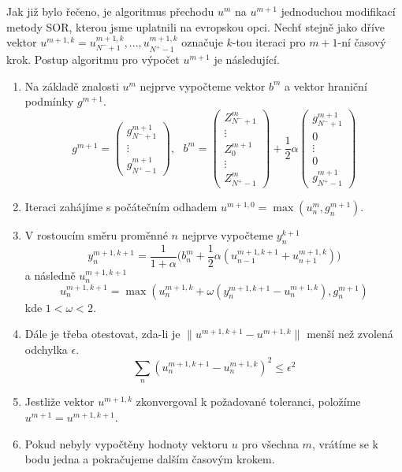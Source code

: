 \documentclass[a4paper]{book}
\begin{document}
Jak již bylo řečeno, je algoritmus přechodu $u^m$ na $u^{m+1}$ jednoduchou modifikací metody SOR, kterou jsme uplatnili na evropskou opci. Nechť stejně jako dříve vektor $u^{m+1,k} = u_{N^{-}+1}^{m+1,k},..., u_{N^{+}-1}^{m+1,k}$ označuje $k$-tou iteraci pro $m+1$-ní časový krok. Postup algoritmu pro výpočet $u^{m+1}$ je následující.
\begin{enumerate}
\item Na základě znalosti $u^m$ nejprve vypočteme vektor $b^m$ a vektor hraniční podmínky $g^{m+1}$.
\begin{equation*}
g^{m+1} =
	\begin{pmatrix}
		g_{N^{-}+1}^{m+1} \\
		\vdots \\
		g_{N^{+}-1}^{m+1}
	\end{pmatrix}
,~~~ b^{m} =
	\begin{pmatrix}
		Z_{N^{-}+1}^{m} \\
		\vdots \\
		Z_0^{m+1}\\
		\vdots \\
		Z_{N^{+}-1}^{m}
	\end{pmatrix}
	+ \frac{1}{2} \alpha
		\begin{pmatrix}
		g_{N^{-}+1}^{m+1} \\
		0 \\
		\vdots\\
		0 \\
		g_{N^{+}-1}^{m+1}
	\end{pmatrix}
\end{equation*}
\item Iteraci zahájíme s počátečním odhadem $u^{m+1,0} = \max(u_n^m, g_n^{m+1})$.
\item V rostoucím směru proměnné $n$ nejprve vypočteme $y_n^{k+1}$
\begin{equation*}
y_n^{m+1, k+1} = \frac{1}{1 + \alpha} \Big( b_n^m + \frac{1}{2} \alpha (u_{n-1}^{m+1, k+1} + u_{n+1}^{m+1, k}) \Big)
\end{equation*}
a následně $u_n^{m+1, k+1}$
\begin{equation*}
u_n^{m+1, k+1} = \max (u_n^{m+1, k} + \omega(y_n^{m+1, k+1} - u_n^{m+1, k}), g_n^{m+1})
\end{equation*}
kde $1 < \omega < 2$.
\item Dále je třeba otestovat, zda-li je $\| u^{m+1, k+1}-u^{m+1,k}\|$ menší než zvolená odchylka $\epsilon$.
\begin{equation*}
\sum_n (u_n^{m+1,k+1} - u_n^{m+1,k})^2 \le \epsilon^2
\end{equation*}
\item Jestliže vektor $u^{m+1,k}$ zkonvergoval k požadované toleranci, položíme $u^{m+1} = u^{m+1,k+1}$.
\item Pokud nebyly vypočtěny hodnoty vektoru $u$ pro všechna $m$, vrátíme se k bodu jedna a pokračujeme dalším časovým krokem.
\end{enumerate}
\end{document}
